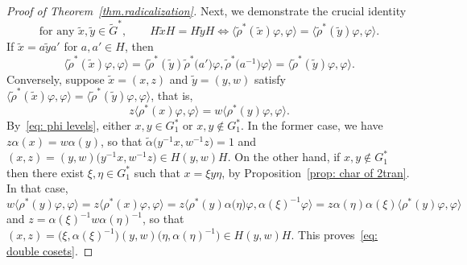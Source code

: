 \begin{proof}[Proof of Theorem~\ref{thm.radicalization}]
Next, we demonstrate the crucial identity
\begin{equation}
\label{eq: double cosets}
\text{for any }\tilde{x},\tilde{y} \in \widetilde{G}^*,
\qquad
H\tilde{x}H = H\tilde{y}H \iff \langle \tilde{\rho}^*(\tilde{x}) \varphi, \varphi \rangle = \langle \tilde{\rho}^*(\tilde{y}) \varphi, \varphi \rangle.
\end{equation}
If $\tilde{x} = a \tilde{y} a'$ for $a,a' \in H$, then
\[ 
\langle \tilde{\rho}^*(\tilde{x}) \varphi, \varphi \rangle 
= \bigl\langle \tilde{\rho}^*(\tilde{y}) \tilde{\rho}^*\bigl(a'\bigr) \varphi, \tilde{\rho}^*\bigl(a^{-1}\bigr)\varphi \bigr\rangle 
= \langle \tilde{\rho}^*(\tilde{y}) \varphi, \varphi \rangle.
\]
Conversely, suppose $\tilde{x} = (x,z)$ and $\tilde{y} = (y,w)$ satisfy $\langle \tilde{\rho}^*(\tilde{x}) \varphi, \varphi \rangle = \langle \tilde{\rho}^*(\tilde{y}) \varphi, \varphi \rangle$, that is, 
\[ z \langle \rho^*(x) \varphi, \varphi \rangle = w \langle \rho^*(y) \varphi, \varphi \rangle. \] 
By~\eqref{eq: phi levels}, either $x,y \in G_1^*$ or $x,y \notin G_1^*$.
In the former case, we have $z \alpha(x) = w \alpha(y)$, so that $\widetilde{\alpha}\bigl(y^{-1}x,w^{-1} z\bigr) = 1$ and $(x,z) = (y,w)\bigl(y^{-1}x,w^{-1}z\bigr) \in H(y,w)H$.
On the other hand, if $x,y \notin G_1^*$ then there exist $\xi, \eta \in G_1^*$ such that $x = \xi y\eta$, by Proposition~\ref{prop: char of 2tran}.
In that case,
\[ 
w \langle \rho^*(y) \varphi, \varphi \rangle 
= z \langle \rho^*(x) \varphi, \varphi \rangle 
= z \bigl\langle \rho^*(y) \alpha\bigl(\eta \bigr) \varphi, \alpha(\xi)^{-1} \varphi \bigr\rangle 
= z \alpha(\eta) \alpha(\xi) \langle \rho^*(y) \varphi, \varphi \rangle
\]
and $z = \alpha(\xi)^{-1} w \alpha(\eta)^{-1}$, so that $(x,z) = \bigl(\xi,\alpha(\xi)^{-1}\bigr) (y,w) \bigl(\eta,\alpha(\eta)^{-1}\bigr) \in H(y,w)H$.
This proves~\eqref{eq: double cosets}.


\end{proof}
